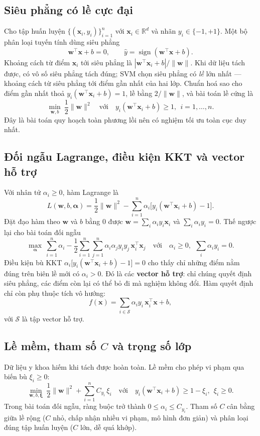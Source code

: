 \documentclass[12pt]{article}
\newcommand{\R}{\mathbb{R}}
\begin{document}
\subsection{Siêu phẳng có lề cực đại}
Cho tập huấn luyện $\{(\mathbf{x}_i, y_i)\}_{i=1}^{n}$ với $\mathbf{x}_i \in \R^{d}$ và nhãn $y_i \in \{-1, +1\}$.
Một bộ phân loại tuyến tính dùng siêu phẳng
\[
  \mathbf{w}^\top \mathbf{x} + b = 0, \qquad \hat{y} = \operatorname{sign}(\mathbf{w}^\top \mathbf{x} + b).
\]
Khoảng cách từ điểm $\mathbf{x}_i$ tới siêu phẳng là $|\mathbf{w}^\top \mathbf{x}_i + b| / \lVert \mathbf{w} \rVert$.
Khi dữ liệu tách được, có vô số siêu phẳng tách đúng; SVM chọn siêu phẳng có \emph{lề} lớn nhất --- khoảng cách
từ siêu phẳng tới điểm gần nhất của hai lớp. Chuẩn hoá sao cho điểm gần nhất thoả $y_i(\mathbf{w}^\top \mathbf{x}_i + b) = 1$,
lề bằng $2 / \lVert \mathbf{w} \rVert$, và bài toán lề cứng là
\[
  \min_{\mathbf{w}, b}\ \frac{1}{2}\lVert \mathbf{w} \rVert^2
  \quad \text{với} \quad y_i(\mathbf{w}^\top \mathbf{x}_i + b) \geq 1,\ \ i = 1, \dots, n .
\]
Đây là bài toán quy hoạch toàn phương lồi nên có nghiệm tối ưu toàn cục duy nhất.

\subsection{Đối ngẫu Lagrange, điều kiện KKT và vector hỗ trợ}
Với nhân tử $\alpha_i \geq 0$, hàm Lagrange là
\[
  L(\mathbf{w}, b, \boldsymbol{\alpha}) = \frac{1}{2}\lVert \mathbf{w} \rVert^2
  - \sum_{i=1}^{n} \alpha_i \big[ y_i(\mathbf{w}^\top \mathbf{x}_i + b) - 1 \big].
\]
Đặt đạo hàm theo $\mathbf{w}$ và $b$ bằng 0 được $\mathbf{w} = \sum_i \alpha_i y_i \mathbf{x}_i$ và
$\sum_i \alpha_i y_i = 0$. Thế ngược lại cho bài toán đối ngẫu
\[
  \max_{\boldsymbol{\alpha}}\ \sum_{i=1}^{n} \alpha_i - \frac{1}{2}\sum_{i=1}^{n}\sum_{j=1}^{n}
  \alpha_i \alpha_j y_i y_j\, \mathbf{x}_i^\top \mathbf{x}_j
  \quad \text{với} \quad \alpha_i \geq 0,\ \ \sum_{i} \alpha_i y_i = 0 .
\]
Điều kiện bù KKT $\alpha_i\big[y_i(\mathbf{w}^\top \mathbf{x}_i + b) - 1\big] = 0$ cho thấy chỉ những điểm nằm đúng
trên biên lề mới có $\alpha_i > 0$. Đó là các \textbf{vector hỗ trợ}: chỉ chúng quyết định siêu phẳng, các điểm còn
lại có thể bỏ đi mà nghiệm không đổi. Hàm quyết định chỉ còn phụ thuộc tích vô hướng:
\[
  f(\mathbf{x}) = \sum_{i \in \mathcal{S}} \alpha_i y_i\, \mathbf{x}_i^\top \mathbf{x} + b ,
\]
với $\mathcal{S}$ là tập vector hỗ trợ.

\subsection{Lề mềm, tham số \texorpdfstring{$C$}{C} và trọng số lớp}
Dữ liệu y khoa hiếm khi tách được hoàn toàn. Lề mềm cho phép vi phạm qua biến bù $\xi_i \geq 0$:
\[
  \min_{\mathbf{w}, b, \boldsymbol{\xi}}\ \frac{1}{2}\lVert \mathbf{w} \rVert^2 + \sum_{i=1}^{n} C_{y_i}\, \xi_i
  \quad \text{với} \quad y_i(\mathbf{w}^\top \mathbf{x}_i + b) \geq 1 - \xi_i,\ \ \xi_i \geq 0 .
\]
Trong bài toán đối ngẫu, ràng buộc trở thành $0 \leq \alpha_i \leq C_{y_i}$. Tham số $C$ cân bằng giữa lề rộng
($C$ nhỏ, chấp nhận nhiều vi phạm, mô hình đơn giản) và phân loại đúng tập huấn luyện ($C$ lớn, dễ quá khớp).
\end{document}
